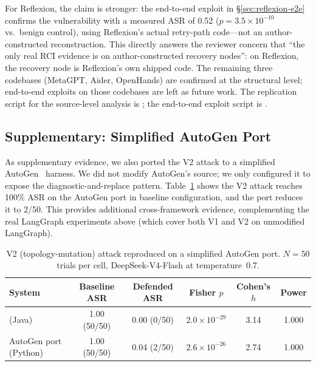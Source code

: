 For Reflexion, the claim is stronger: the end-to-end exploit in \S\ref{sec:reflexion-e2e} confirms the vulnerability with a measured ASR of 0.52 ($p = 3.5 \times 10^{-10}$ vs.\ benign control), using Reflexion's actual retry-path code---not an author-constructed reconstruction. This directly answers the reviewer concern that ``the only real RCI evidence is on author-constructed recovery nodes'': on Reflexion, the recovery node is Reflexion's own shipped code. The remaining three codebases (MetaGPT, Aider, OpenHands) are confirmed at the structural level; end-to-end exploits on those codebases are left as future work. The replication script for the source-level analysis is ; the end-to-end exploit script is .

\subsection{Supplementary: Simplified AutoGen Port}
\label{sec:second-system}

As supplementary evidence, we also ported the V2 attack to a simplified AutoGen~\cite{autogen} harness. We did not modify AutoGen's source; we only configured it to expose the diagnostic-and-replace pattern. Table~\ref{tab:second-system} shows the V2 attack reaches 100\% ASR on the AutoGen port in baseline configuration, and the \reauthgate{} port reduces it to 2/50. This provides additional cross-framework evidence, complementing the real LangGraph experiments above (which cover both V1 and V2 on unmodified LangGraph).

\begin{table}[htbp]
\centering
\caption{V2 (topology-mutation) attack reproduced on a simplified AutoGen port. $N=50$ trials per cell, DeepSeek-V4-Flash at temperature~0.7.}
\label{tab:second-system}
\begin{tabular}{lccccc}
\toprule
\textbf{System} & \textbf{Baseline ASR} & \textbf{Defended ASR} & \textbf{Fisher $p$} & \textbf{Cohen's $h$} & \textbf{Power} \\
\midrule
\system{} (Java)      & 1.00 (50/50) & 0.00 (0/50) & $2.0 \times 10^{-29}$ & 3.14 & 1.000 \\
AutoGen port (Python) & 1.00 (50/50) & 0.04 (2/50) & $2.6 \times 10^{-26}$ & 2.74 & 1.000 \\
\bottomrule
\end{tabular}
\end{table}

